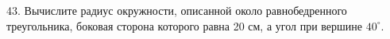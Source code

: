 43. Вычислите радиус окружности, описанной около равнобедренного треугольника, боковая сторона которого равна 20 см, а угол при вершине $40^\circ.$\\
